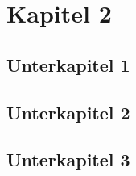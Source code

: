 \chapter{Kapitel 2}
\blindtext
\section{Unterkapitel 1}
\blindtext
\section{Unterkapitel 2}
\blindtext
\section{Unterkapitel 3}
\blindtext